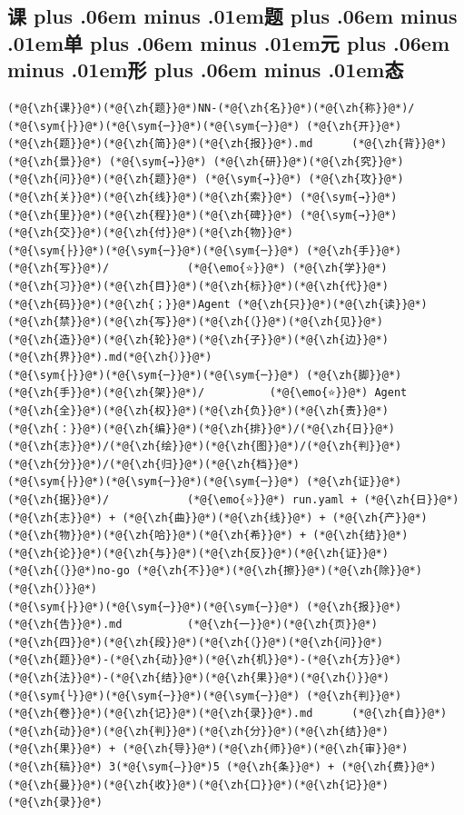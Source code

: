 \documentclass[
]{article}
\def\zh#1{{\zhfont #1}}
\def\sym#1{{\symfont #1}}
\def\emo#1{{\emofont #1}}
\def\zhglue{\hskip0pt plus .06em minus .01em}
\begin{document}
\subsection{\zh{课\zhglue 题\zhglue 单\zhglue 元\zhglue 形\zhglue 态}}\label{ux8bfeux9898ux5355ux5143ux5f62ux6001}

\begin{lstlisting}
(*@{\zh{课}}@*)(*@{\zh{题}}@*)NN-(*@{\zh{名}}@*)(*@{\zh{称}}@*)/
(*@{\sym{├}}@*)(*@{\sym{─}}@*)(*@{\sym{─}}@*) (*@{\zh{开}}@*)(*@{\zh{题}}@*)(*@{\zh{简}}@*)(*@{\zh{报}}@*).md      (*@{\zh{背}}@*)(*@{\zh{景}}@*) (*@{\sym{→}}@*) (*@{\zh{研}}@*)(*@{\zh{究}}@*)(*@{\zh{问}}@*)(*@{\zh{题}}@*) (*@{\sym{→}}@*) (*@{\zh{攻}}@*)(*@{\zh{关}}@*)(*@{\zh{线}}@*)(*@{\zh{索}}@*) (*@{\sym{→}}@*) (*@{\zh{里}}@*)(*@{\zh{程}}@*)(*@{\zh{碑}}@*) (*@{\sym{→}}@*) (*@{\zh{交}}@*)(*@{\zh{付}}@*)(*@{\zh{物}}@*)
(*@{\sym{├}}@*)(*@{\sym{─}}@*)(*@{\sym{─}}@*) (*@{\zh{手}}@*)(*@{\zh{写}}@*)/            (*@{\emo{⭐}}@*) (*@{\zh{学}}@*)(*@{\zh{习}}@*)(*@{\zh{目}}@*)(*@{\zh{标}}@*)(*@{\zh{代}}@*)(*@{\zh{码}}@*)(*@{\zh{；}}@*)Agent (*@{\zh{只}}@*)(*@{\zh{读}}@*)(*@{\zh{禁}}@*)(*@{\zh{写}}@*)(*@{\zh{（}}@*)(*@{\zh{见}}@*) (*@{\zh{造}}@*)(*@{\zh{轮}}@*)(*@{\zh{子}}@*)(*@{\zh{边}}@*)(*@{\zh{界}}@*).md(*@{\zh{）}}@*)
(*@{\sym{├}}@*)(*@{\sym{─}}@*)(*@{\sym{─}}@*) (*@{\zh{脚}}@*)(*@{\zh{手}}@*)(*@{\zh{架}}@*)/          (*@{\emo{⭐}}@*) Agent (*@{\zh{全}}@*)(*@{\zh{权}}@*)(*@{\zh{负}}@*)(*@{\zh{责}}@*)(*@{\zh{：}}@*)(*@{\zh{编}}@*)(*@{\zh{排}}@*)/(*@{\zh{日}}@*)(*@{\zh{志}}@*)/(*@{\zh{绘}}@*)(*@{\zh{图}}@*)/(*@{\zh{判}}@*)(*@{\zh{分}}@*)/(*@{\zh{归}}@*)(*@{\zh{档}}@*)
(*@{\sym{├}}@*)(*@{\sym{─}}@*)(*@{\sym{─}}@*) (*@{\zh{证}}@*)(*@{\zh{据}}@*)/            (*@{\emo{⭐}}@*) run.yaml + (*@{\zh{日}}@*)(*@{\zh{志}}@*) + (*@{\zh{曲}}@*)(*@{\zh{线}}@*) + (*@{\zh{产}}@*)(*@{\zh{物}}@*)(*@{\zh{哈}}@*)(*@{\zh{希}}@*) + (*@{\zh{结}}@*)(*@{\zh{论}}@*)(*@{\zh{与}}@*)(*@{\zh{反}}@*)(*@{\zh{证}}@*)(*@{\zh{（}}@*)no-go (*@{\zh{不}}@*)(*@{\zh{擦}}@*)(*@{\zh{除}}@*)(*@{\zh{）}}@*)
(*@{\sym{├}}@*)(*@{\sym{─}}@*)(*@{\sym{─}}@*) (*@{\zh{报}}@*)(*@{\zh{告}}@*).md          (*@{\zh{一}}@*)(*@{\zh{页}}@*)(*@{\zh{四}}@*)(*@{\zh{段}}@*)(*@{\zh{（}}@*)(*@{\zh{问}}@*)(*@{\zh{题}}@*)-(*@{\zh{动}}@*)(*@{\zh{机}}@*)-(*@{\zh{方}}@*)(*@{\zh{法}}@*)-(*@{\zh{结}}@*)(*@{\zh{果}}@*)(*@{\zh{）}}@*)
(*@{\sym{└}}@*)(*@{\sym{─}}@*)(*@{\sym{─}}@*) (*@{\zh{判}}@*)(*@{\zh{卷}}@*)(*@{\zh{记}}@*)(*@{\zh{录}}@*).md      (*@{\zh{自}}@*)(*@{\zh{动}}@*)(*@{\zh{判}}@*)(*@{\zh{分}}@*)(*@{\zh{结}}@*)(*@{\zh{果}}@*) + (*@{\zh{导}}@*)(*@{\zh{师}}@*)(*@{\zh{审}}@*)(*@{\zh{稿}}@*) 3(*@{\sym{–}}@*)5 (*@{\zh{条}}@*) + (*@{\zh{费}}@*)(*@{\zh{曼}}@*)(*@{\zh{收}}@*)(*@{\zh{口}}@*)(*@{\zh{记}}@*)(*@{\zh{录}}@*)
\end{lstlisting}
\end{document}
